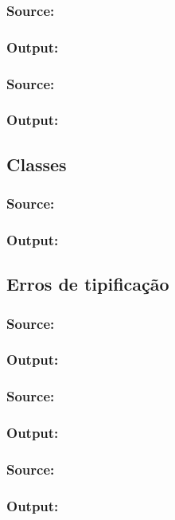 {\subsubsection*{Source:}

\subsubsection*{Output:}

\vspace{\baselineskip}
\subsubsection*{Source:}

\subsubsection*{Output:}


\subsection*{Classes}
\subsubsection*{Source:}

\subsubsection*{Output:}


\newpage
\subsection*{Erros de tipificação}
\subsubsection*{Source:}

\subsubsection*{Output:}


\subsubsection*{Source:}

\subsubsection*{Output:}


\subsubsection*{Source:}

\subsubsection*{Output:}



\flushbottom
}
